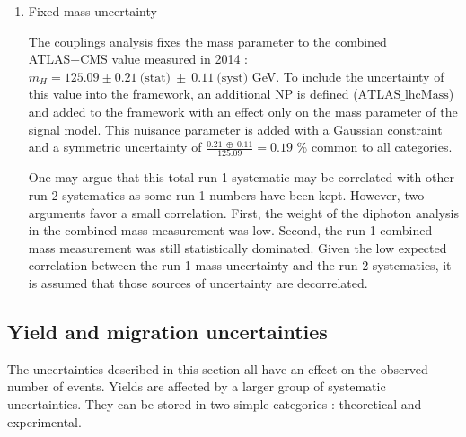 \begin{enumerate}
\item Fixed mass uncertainty
\label{sec:org220d36d}
\label{subsec:FixedMass}

The couplings analysis fixes the mass parameter to the combined ATLAS+CMS value measured in 2014 \cite{CERN-PH-EP-2015-075} : $m_{H}=125.09 \pm 0.21\ \text{(stat)} \  \pm \  0.11\ \text{(syst)}$ GeV.
To include the uncertainty of this value into the framework, an additional NP is defined (\(\text{ATLAS\_lhcMass}\)) and added to the framework with an effect only on the mass parameter of the signal model.
This nuisance parameter is added with a Gaussian constraint and a symmetric uncertainty of \(\frac{0.21\ \oplus\ 0.11}{125.09}=0.19\) \% common to all categories.

One may argue that this total run 1 systematic may be correlated with other run 2 systematics as some run 1 numbers have been kept.
However, two arguments favor a small correlation.
First, the weight of the diphoton analysis in the combined mass measurement was low.
Second, the run 1 combined mass measurement was still statistically dominated.
Given the low expected correlation between the run 1 mass uncertainty and the run 2 systematics, it is assumed that those sources of uncertainty are decorrelated.
\end{enumerate}

\subsection{Yield and migration uncertainties}
  \label{sec:org17f2003}

The uncertainties described in this section all have an effect on the observed number of events.
Yields are affected by a larger group of systematic uncertainties.
They can be stored in two simple categories : theoretical and experimental.


